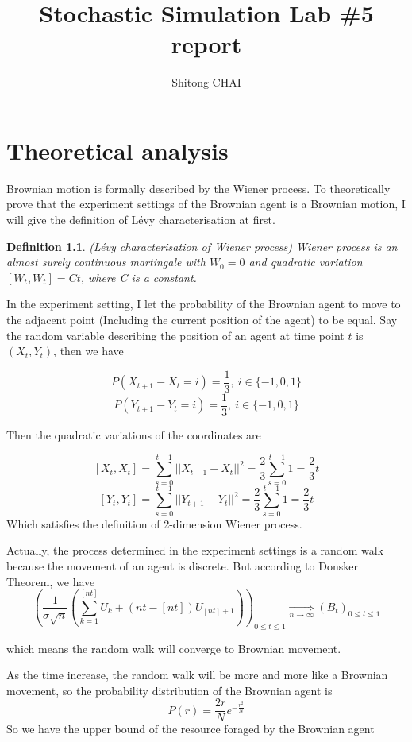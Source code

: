 \documentclass[a4paper, 12pt]{report}
\title{Stochastic Simulation Lab \#5 report}
\author{Shitong CHAI}
\date{}
\newtheorem{definition}{Definition}[section]
\begin{document}
\maketitle 
\tableofcontents
\chapter{Theoretical analysis}

Brownian motion is formally described by the Wiener process. To theoretically prove that the experiment settings of the Brownian agent is a Brownian motion, I will give the definition of Lévy characterisation at first.

\begin{definition}
    (Lévy characterisation of Wiener process\cite{wiki:brownian}) Wiener process is an almost surely continuous martingale with $W_0=0$ and quadratic variation $[W_t,W_t]=Ct$, where C is a constant.
\end{definition}

In the experiment setting, I let the probability of the Brownian agent to move to the adjacent point (Including the current position of the agent) to be equal. Say the random variable describing the position of an agent at time point $t$ is $(X_t, Y_t)$, then we have

$$ P(X_{t+1}-X_t=i)=\frac{1}{3},\  i\in\{-1,0,1\}$$
$$ P(Y_{t+1}-Y_t=i)=\frac{1}{3},\  i\in\{-1,0,1\}$$

Then the quadratic variations\cite{williams1991probability} of the coordinates are

$$[X_t,X_t] = \sum_{s=0}^{t-1} ||X_{t+1}-X_t||^2 = \frac{2}{3}\sum_{s=0}^{t-1} 1 = \frac{2}{3}t $$ %
$$[Y_t,Y_t] = \sum_{s=0}^{t-1} ||Y_{t+1}-Y_t||^2 = \frac{2}{3}\sum_{s=0}^{t-1} 1 = \frac{2}{3}t $$ 
Which satisfies the definition of 2-dimension Wiener process.

Actually, the process determined in the experiment settings is a random walk because the movement of an agent is discrete. But according to Donsker Theorem\cite{williams1991probability}, we have
$$\left({\frac  {1}{\sigma {\sqrt  {n}}}}\left(\sum _{{k=1}}^{{[nt]}}U_{k}+(nt-[nt])U_{{[nt]+1}}\right)\right)_{{0\leq t\leq 1}}{\underset  {n\rightarrow \infty }{\Longrightarrow }}(B_{t})_{{0\leq t\leq 1}}$$

which means the random walk will converge to Brownian movement.

As the time increase, the random walk will be more and more like a Brownian movement, so the probability distribution\cite{wiki:randwalk} of the Brownian agent is 
$$P(r)=\frac{2r}{N}e^{-\frac{r^2}{N}}$$
So we have the upper bound\cite{wiki:randwalk} of the resource foraged by the Brownian agent
\end{document}
